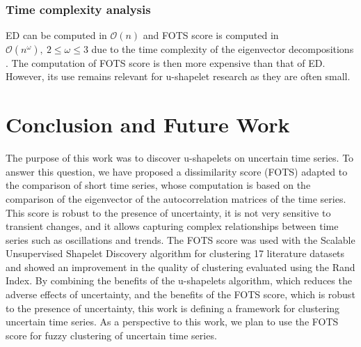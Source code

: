 \subsubsection{Time complexity analysis} ED can be computed in $\mathcal{O}(n)$ and  FOTS score is computed in $\mathcal{O}(n^\omega),\:2\leq\omega\leq3$ due to the time complexity of the eigenvector decompositions \cite{pan1999complexity}. The computation of FOTS score is then more expensive than that of ED. However, its use remains relevant for u-shapelet research as they are often small.



\section{Conclusion and Future Work}
The purpose of this work was to discover u-shapelets on uncertain time series. To answer this question, we have proposed a dissimilarity score (FOTS) adapted to the comparison of short time series, whose computation is based on the comparison of the eigenvector of the autocorrelation matrices of the time series. This score is robust to the presence of uncertainty, it is not very sensitive to transient changes, and it allows capturing complex relationships between time series such as oscillations and trends. The FOTS score was used with the Scalable Unsupervised Shapelet Discovery algorithm for clustering 17 literature datasets and showed an improvement in the quality of clustering evaluated using the Rand Index.  By combining the benefits of the u-shapelets algorithm, which reduces the adverse effects of uncertainty, and the benefits of the FOTS score, which is robust to the presence of uncertainty, this work is defining a framework for clustering uncertain time series. As a perspective to this work, we plan to use the FOTS score for fuzzy clustering of uncertain time series.
